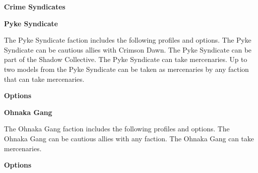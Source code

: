 \documentclass{article}
\begin{document}
{\Huge \textbf{Crime Syndicates}}
\vspace{0.6cm}

{\Large \textbf{Pyke Syndicate}}
\vspace{0.3cm}

\begin{minipage}{19cm}
    The Pyke Syndicate faction includes the following profiles and options.
    The Pyke Syndicate can be cautious allies with Crimson Dawn.
    The Pyke Syndicate can be part of the Shadow Collective.
    The Pyke Syndicate can take mercenaries.
    Up to two models from the Pyke Syndicate can be taken as mercenaries
    by any faction that can take mercenaries.
\end{minipage}

\vspace{0.3cm}
{\scriptsize
\setlength\extrarowheight{1.5pt}

}
\vspace{0.6cm}

{\large \textbf{Options}}
\vspace{0.3cm}
\begin{multicols}{2}
    {\scriptsize

    \setlength\extrarowheight{1.5pt}
    

    \vspace{0.6cm}

    \setlength\extrarowheight{1.5pt}
    

    }
\end{multicols}

{\Large \textbf{Ohnaka Gang}}
\vspace{0.3cm}

\begin{minipage}{19cm}
    The Ohnaka Gang faction includes the following profiles and options.
    The Ohnaka Gang can be cautious allies with any faction.
    The Ohnaka Gang can take mercenaries.
\end{minipage}

\vspace{0.3cm}
{\scriptsize
\setlength\extrarowheight{1.5pt}

}
\vspace{0.6cm}

{\large \textbf{Options}}
\vspace{0.3cm}
\begin{multicols}{2}
    {\scriptsize

    \setlength\extrarowheight{1.5pt}
    

    \vspace{0.6cm}

    \setlength\extrarowheight{1.5pt}
    

    \vspace{0.6cm}

    \setlength\extrarowheight{1.5pt}
    

    }
\end{multicols}
\end{document}
